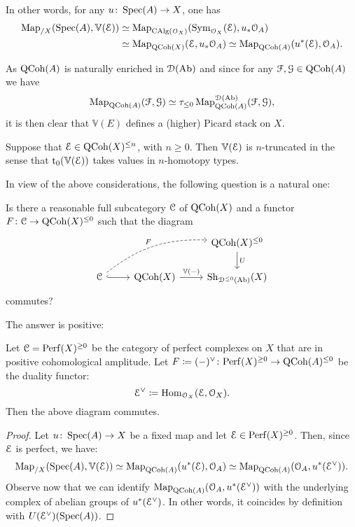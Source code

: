 \begin{rem}
	In other words, for any $u \colon \operatorname{Spec}(A) \to X$, one has
	\begin{align*}
		\operatorname{Map}_{/X}(\operatorname{Spec}(A), \mathbb V(\mathcal E)) & \simeq \operatorname{Map}_{\mathrm{CAlg}(\mathcal O_X)}(\operatorname{Sym}_{\mathcal O_X}(\mathcal E), u_* \mathcal O_A) \\
		& \simeq \operatorname{Map}_{\mathrm{QCoh}(X)}(\mathcal E, u_* \mathcal O_A) \simeq \operatorname{Map}_{\mathrm{QCoh}(A)}(u^*(\mathcal E), \mathcal O_A) .
	\end{align*}
\end{rem}

As $\mathrm{QCoh}(A)$ is naturally enriched in $\mathcal D(\mathrm{Ab})$ and since for any $\mathcal F, \mathcal G \in \mathrm{QCoh}(A)$ we have
\[ \operatorname{Map}_{\mathrm{QCoh}(A)}(\mathcal F, \mathcal G) \simeq \tau_{\le 0} \operatorname{Map}_{\mathrm{QCoh}(A)}^{\mathcal D(\mathrm{Ab})}(\mathcal F, \mathcal G) , \]
it is then clear that $\mathbb V(E)$ defines a (higher) Picard stack on $X$.

\begin{rem}
	Suppose that $\mathcal E \in \mathrm{QCoh}(X)^{\le n}$, with $n \ge 0$.
	Then $\mathbb V(\mathcal E)$ is $n$-truncated in the sense that $\mathrm{t}_0(\mathbb V(\mathcal E))$ takes values in $n$-homotopy types.
\end{rem}

In view of the above considerations, the following question is a natural one:

\begin{question}
	Is there a reasonable full subcategory $\mathcal C$ of $\mathrm{QCoh}(X)$ and a functor $F \colon \mathcal C \to \mathrm{QCoh}(X)^{\le 0}$ such that the diagram
	\[ \begin{tikzcd}
		{} & & \QCoh(X)^{\le 0} \arrow{d}{U} \\
		\cC \arrow[dashed, bend left = 20]{urr}{F} \arrow[hook]{r} & \QCoh(X) \arrow{r}{\mathbb V(-)} & \Sh_{\cD^{\le 0}(\Ab)}(X)
	\end{tikzcd} \]
	commutes?
\end{question}

The answer is positive:

\begin{prop}
	Let $\mathcal C = \mathrm{Perf}(X)^{\ge 0}$ be the category of perfect complexes on $X$ that are in positive cohomological amplitude.
	Let $F \coloneqq (-)^\vee \colon \mathrm{Perf}(X)^{\ge 0} \to \mathrm{QCoh}(A)^{\le 0}$ be the duality functor:
	\[ \mathcal E^\vee \coloneqq \operatorname{Hom}_{\mathcal O_X}(\mathcal E, \mathcal O_X) . \]
	Then the above diagram commutes.
\end{prop}

\begin{proof}
	Let $u \colon \operatorname{Spec}(A) \to X$ be a fixed map and let $\mathcal E \in \mathrm{Perf}(X)^{\ge 0}$.
	Then, since $\mathcal E$ is perfect, we have:
	\[ \operatorname{Map}_{/X}(\operatorname{Spec}(A), \mathbb V(\mathcal E)) \simeq \operatorname{Map}_{\mathrm{QCoh}(A)}(u^*(\mathcal E), \mathcal O_A) \simeq \operatorname{Map}_{\mathrm{QCoh}(A)}(\mathcal O_A, u^*(\mathcal E^\vee)) . \]
	Observe now that we can identify $\operatorname{Map}_{\mathrm{QCoh}(A)}(\mathcal O_A, u^*(\mathcal E^\vee))$ with the underlying complex of abelian groups of $u^*(\mathcal E^\vee)$.
	In other words, it coincides by definition with $U(\mathcal E^\vee)(\operatorname{Spec}(A))$.
\end{proof}

